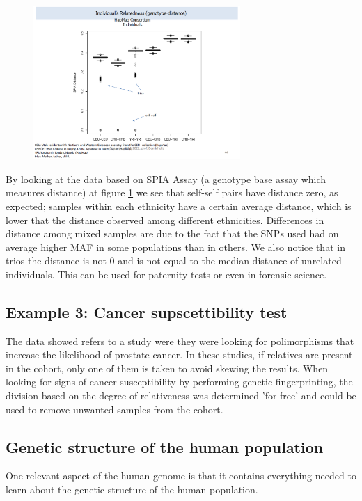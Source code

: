 \begin{figure}
	\centering
	\includegraphics[width = 0.7\textwidth]{trios.PNG}
	\caption{\label{fig: trios}}
\end{figure}

By looking at the data based on SPIA Assay (a genotype base assay which measures
distance) at figure \ref{fig: trios} we see that self-self pairs have distance
zero, as expected; samples within each ethnicity have a certain average
distance, which is lower that the distance observed among different ethnicities.
Differences in distance among mixed samples are due to the fact that the SNPs
used had on average higher MAF in some populations than in others. We also
notice that in trios the distance is not 0 and is not equal to the median
distance of unrelated individuals. This can be used for paternity tests or even
in forensic science.

\subsection{Example 3: Cancer supscettibility test}
The data showed refers to a study were they were looking for polimorphisms that
increase the likelihood of prostate cancer. In these studies, if relatives are
present in the cohort, only one of them is taken to avoid skewing the results.
When looking for signs of cancer susceptibility by performing genetic
fingerprinting, the division based on the degree of relativeness was determined
'for free' and could be used to remove unwanted samples from the cohort.


\subsection{Genetic structure of the human population}

One relevant aspect of the human genome is that it contains everything needed to
learn about the genetic structure of the human population. 

